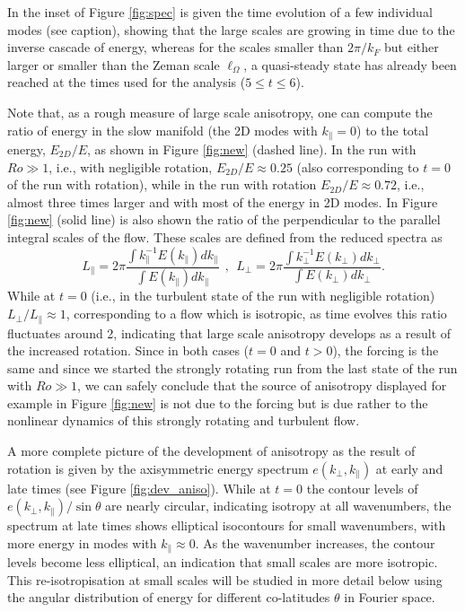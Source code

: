 \documentclass[aps,amsmath,amssymb,floatfix,showpacs]{revtex4}
\begin{document}
In the inset of Figure \ref{fig:spec} is given the time evolution of a few individual modes (see caption), showing that the large scales are growing in time due to the inverse cascade of energy, whereas for the scales smaller than $2\pi/k_F$ but either larger or smaller than the Zeman scale $\ell_{\Omega}$, a quasi-steady state has already been reached at the times used for the analysis ($5 \le t \le 6$).

Note that, as a rough measure of large scale anisotropy,  one can compute the ratio of energy in the slow manifold (the 2D modes with $k_{\parallel}=0$) to the total energy, $E_{2D}/E$, as shown in Figure \ref{fig:new} (dashed line). In the run with $Ro\gg 1$, i.e., with negligible rotation, $E_{2D}/E\approx 0.25$ (also corresponding to $t=0$ of the run with rotation), while in the run with rotation $E_{2D}/E\approx 0.72$, i.e., almost three times larger and with most of the energy in 2D modes. In Figure \ref{fig:new} (solid line) is also shown the ratio of the perpendicular to the parallel integral scales of the flow. These scales are defined from the reduced spectra as
\begin{equation}
L_{\parallel} = 2\pi \frac{\int k_{\parallel}^{-1} E(k_{\parallel}) 
    dk_{\parallel}}{\int E(k_{\parallel}) dk_{\parallel}}  \ \ , \ \
    L_{\perp} = 2\pi \frac{\int k_{\perp}^{-1} E(k_{\perp}) 
    dk_{\perp}}{\int E(k_{\perp}) dk_{\perp}} .
\label{scales}\end{equation}
While at $t=0$ (i.e., in the turbulent state of the run with negligible rotation) $L_\perp/L_\parallel \approx 1$, corresponding to a flow which is isotropic, as time evolves this ratio fluctuates around 2, indicating that large scale anisotropy develops as a result of the increased rotation. Since in both cases ($t=0$ and $t>0$), the forcing is the same and since we started the strongly rotating run from the last state of the run with $Ro\gg 1$, we can safely conclude that the source of anisotropy displayed for example in Figure \ref{fig:new} is not due to the forcing but is due rather to the nonlinear dynamics of this strongly rotating and turbulent flow.

{A more complete picture of the development of anisotropy as the result of rotation is given by the axisymmetric energy spectrum $e(k_\perp,k_\parallel)$ at early and late times (see Figure \ref{fig:dev_aniso}). While at $t=0$ the contour levels of $e(k_\perp,k_\parallel)/\sin\theta$ are nearly circular, indicating isotropy at all wavenumbers, the spectrum at late times shows elliptical isocontours for small wavenumbers, with more energy in modes with $k_\parallel \approx 0$. As the wavenumber increases, the contour levels become less elliptical, an indication that small scales are more isotropic. This re-isotropisation at small scales will be studied in more detail below using the angular distribution of energy for different co-latitudes $\theta$ in Fourier space.}
\end{document}
